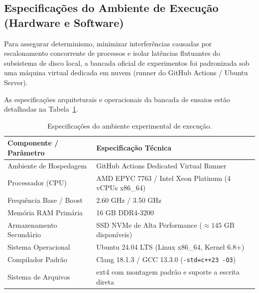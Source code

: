 \documentclass[12pt,a4paper]{article}
\begin{document}
\subsection{Especificações do Ambiente de Execução (Hardware e Software)}
Para assegurar determinismo, minimizar interferências causadas por escalonamento concorrente de processos e isolar latências flutuantes do subsistema de disco local, a bancada oficial de experimentos foi padronizada sob uma máquina virtual dedicada em nuvem (runner do GitHub Actions / Ubuntu Server).

As especificações arquiteturais e operacionais da bancada de ensaios estão detalhadas na Tabela~\ref{tab:hardware}.

\begin{table}[H]
\centering
\caption{Especificações do ambiente experimental de execução.}
\label{tab:hardware}
\begin{tabular}{p{} p{}}
\toprule
\textbf{Componente / Parâmetro} & \textbf{Especificação Técnica} \\
\midrule
Ambiente de Hospedagem & GitHub Actions Dedicated Virtual Runner \\
Processador (CPU) & AMD EPYC 7763 / Intel Xeon Platinum (4 vCPUs x86\_64) \\
Frequência Base / Boost & 2.60 GHz / 3.50 GHz \\
Memória RAM Primária & 16 GB DDR4-3200 \\
Armazenamento Secundário & SSD NVMe de Alta Performance ($\approx 145$ GB disponíveis) \\
Sistema Operacional & Ubuntu 24.04 LTS (Linux x86\_64, Kernel 6.8+) \\
Compilador Padrão & Clang 18.1.3 / GCC 13.3.0 (\texttt{-std=c++23 -O3}) \\
Sistema de Arquivos & ext4 com montagem padrão e suporte a escrita direta \\
\bottomrule
\end{tabular}
\end{table}
\end{document}
